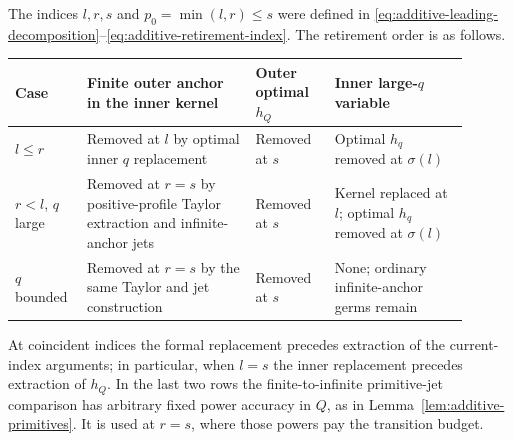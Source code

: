 The indices $l,r,s$ and $p_0=\min(l,r)\le s$ were defined in
\eqref{eq:additive-leading-decomposition}--\eqref{eq:additive-retirement-index}.
The retirement order is as follows.
\begin{center}
\small
\begin{tabular}{@{}>{\raggedright\arraybackslash}p{0.13\linewidth}>{\raggedright\arraybackslash}p{0.34\linewidth}>{\raggedright\arraybackslash}p{0.16\linewidth}>{\raggedright\arraybackslash}p{0.27\linewidth}@{}}
\toprule
Case & Finite outer anchor in the inner kernel & Outer optimal $h_Q$
 & Inner large-$q$ variable\\
\midrule
$l\le r$ & Removed at $l$ by optimal inner $q$ replacement
 & Removed at $s$ & Optimal $h_q$ removed at $\sigma(l)$\\[3pt]
$r<l$, $q$ large & Removed at $r=s$ by positive-profile Taylor
extraction and infinite-anchor jets
 & Removed at $s$ & Kernel replaced at $l$; optimal $h_q$ removed
at $\sigma(l)$\\[3pt]
$q$ bounded & Removed at $r=s$ by the same Taylor and jet construction
 & Removed at $s$ & None; ordinary infinite-anchor germs remain\\
\bottomrule
\end{tabular}
\end{center}
At coincident indices the formal replacement precedes extraction of
the current-index arguments; in particular, when $l=s$ the inner
replacement precedes extraction of $h_Q$.  In the last two rows the
finite-to-infinite primitive-jet comparison has arbitrary fixed power
accuracy in $Q$, as in Lemma~\ref{lem:additive-primitives}.  It is used
at $r=s$, where those powers pay the transition budget.

